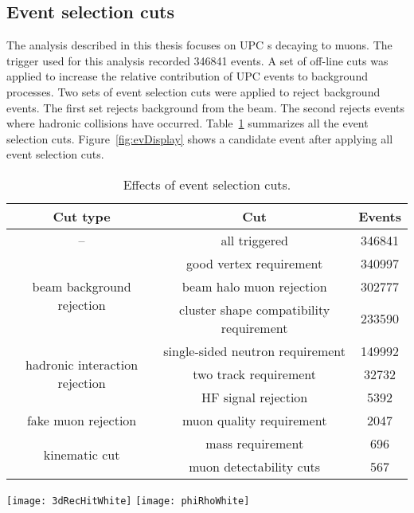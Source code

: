     \subsection{Event selection cuts}
      The analysis described in this thesis focuses on UPC \JPsi{}s decaying to 
        muons. 
      The trigger used for this analysis recorded 346841 events.
      A set of off-line cuts was applied to increase the relative contribution 
        of UPC events to background processes. 
      Two sets of event selection cuts were applied to reject background events. 
      The first set rejects background from the beam.
      The second rejects events where hadronic collisions have occurred.
      Table~\ref{tab:evSelCutNumbers} summarizes all the event selection cuts.
      Figure~\ref{fig:evDisplay} shows a candidate event after applying all 
        event selection cuts. 
      \begin{table}[!Hhbt]
        \centering
        \begin{tabular}{|c|c|c|} \hline 
          Cut type & Cut & Events \\ \hline
          -- & all triggered & 346841 \\ \hline
          \multirow{3}{*}{beam background rejection} & good vertex requirement & 340997 \\ \hhline{~--}
          & beam halo muon rejection & 302777 \\ \hhline{~--}
          & cluster shape compatibility requirement & 233590 \\ \hline
          \multirow{3}{*}{hadronic interaction rejection} & single-sided neutron requirement & 149992 \\ \hhline{~--}
          & two track requirement & 32732 \\ \hhline{~--}
          & HF signal rejection & 5392 \\ \hline
          fake muon rejection & muon quality requirement & 2047 \\ \hline
          \multirow{2}{*}{kinematic cut} & \JPsi{} mass requirement & 696 \\ \hhline{~--}
          & muon detectability cuts & 567 \\ \hline
        \end{tabular}
        \caption{Effects of event selection cuts.}
        \label{tab:evSelCutNumbers}
      \end{table}
      \begin{figure*}[!Hhbt]
        \centering
        \texttt{[image: 3dRecHitWhite]}
        \texttt{[image: phiRhoWhite]}
        \caption{Event display of a UPC \JPsi{} candidate event.}
      \label{fig:evDisplay}
      \end{figure*}


